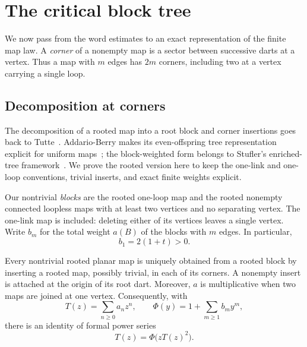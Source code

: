 \section{The critical block tree}\label{block:section}

We now pass from the word estimates to an exact representation of the
finite map law. A \emph{corner} of a nonempty map is a sector between
successive darts at a vertex. Thus a map with $m$ edges has $2m$
corners, including two at a vertex carrying a single loop.

\subsection{Decomposition at corners}

The decomposition of a rooted map into a root block and corner insertions
goes back to Tutte~\cite[Section~6]{Tutte1963}. Addario-Berry makes its
even-offspring tree representation explicit for uniform
maps~\cite[Section~2 and Proposition~3.1]{AddarioBerry2019}; the
block-weighted form belongs to Stufler's enriched-tree
framework~\cite[preprint Section~6.1.5]{Stufler2020}.
We prove the rooted version here to keep the one-link and one-loop
conventions, trivial inserts, and exact finite weights explicit.

Our nontrivial \emph{blocks} are the rooted one-loop map and the rooted
nonempty connected loopless maps with at least two vertices and no
separating vertex. The one-link map is included: deleting either of its
vertices leaves a single vertex. Write $b_m$ for the total weight
$a(B)$ of the blocks with $m$ edges. In particular,
\begin{equation}\label{block:one-edge}
 b_1=2(1+t)>0.
\end{equation}

\begin{lemma}\label{block:decomposition}
Every nontrivial rooted planar map is uniquely obtained from a rooted
block by inserting a rooted map, possibly trivial, in each of its
corners. A nonempty insert is attached at the origin of its root dart.
Moreover, $a$ is multiplicative when two maps are joined at one vertex.
Consequently, with
\[
 T(z)=\sum_{n\ge0}a_nz^n,\qquad
 \Phi(y)=1+\sum_{m\ge1}b_my^m,
\]
there is an identity of formal power series
\begin{equation}\label{block:equation}
 T(z)=\Phi\big(zT(z)^2\big).
\end{equation}
\end{lemma}

